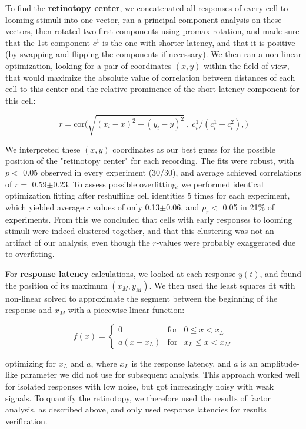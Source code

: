 \documentclass{article}
\begin{document}
To find the \textbf{retinotopy center}, we concatenated all responses of every cell to looming stimuli into one vector, ran a principal component analysis on these vectors, then rotated two first components using promax rotation, and made sure that the 1st component $c^1$ is the one with shorter latency, and that it is positive (by swapping and flipping the components if necessary). We then ran a non-linear optimization, looking for a pair of coordinates $(x,y)$ within the field of view, that would maximize the absolute value of correlation between distances of each cell to this center and the relative prominence of the short-latency component for this cell:

\[ r = \text{cor}\big(\sqrt{(x_i-x)^2+(y_i-y)^2}\ ,\ c^1_i/(c^1_i + c^2_i), \big) \]

We interpreted these $(x,y)$ coordinates as our best guess for the possible position of the "retinotopy center" for each recording. The fits were robust, with $p<$ 0.05 observed in every experiment (30/30), and average achieved correlations of $r=$ 0.59$\pm$0.23. To assess possible overfitting, we performed identical optimization fitting  after reshuffling cell identities 5 times for each experiment, which yielded average $r$ values of only 0.13$\pm$0.06, and $p_r<$ 0.05 in 21\% of experiments. From this we concluded that cells with early responses to looming stimuli were indeed clustered together, and that this clustering was not an artifact of our analysis, even though the $r$-values were probably exaggerated due to overfitting.

For \textbf{response latency} calculations, we looked at each response $y(t)$, and found the position of its maximum $(x_M, y_M)$. We then used the least squares fit with non-linear solved to approximate the segment between the beginning of the response and $x_M$ with a piecewise linear function:

\[ f(x) = \left \{ \begin{array}{cll} 0 & \text{for} & 0 \leqslant x<x_L \\
a (x-x_L) & \text{for} & x_L\leqslant x < x_M \end{array} \right. \]

optimizing for $x_L$ and $a$, where $x_L$ is the response latency, and $a$ is an amplitude-like parameter we did not use for subsequent analysis. This approach worked well for isolated responses with low noise, but got increasingly noisy with weak signals. To quantify the retinotopy, we therefore used the results of factor analysis, as described above, and only used response latencies for results verification.
\end{document}
